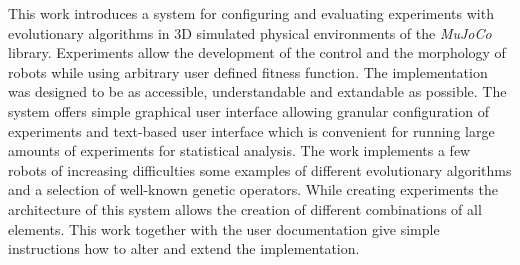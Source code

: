 \documentclass[12pt]{report}
\begin{document}
This work introduces a system for configuring and evaluating experiments with
evolutionary algorithms in 3D simulated physical environments of the
\emph{MuJoCo} library. Experiments allow the development of the control and the
morphology of robots while using arbitrary user defined fitness function. The
implementation was designed to be as accessible, understandable and extandable
as possible. The system offers simple graphical user interface allowing
granular configuration of experiments and text-based user interface which is
convenient for running large amounts of experiments for statistical analysis.
The work implements a few robots of increasing difficulties some examples of
different evolutionary algorithms and a selection of well-known genetic
operators. While creating experiments the architecture of this system allows
the creation of different combinations of all elements. This work together with
the user documentation give simple instructions how to alter and extend the
implementation.
\end{document}
